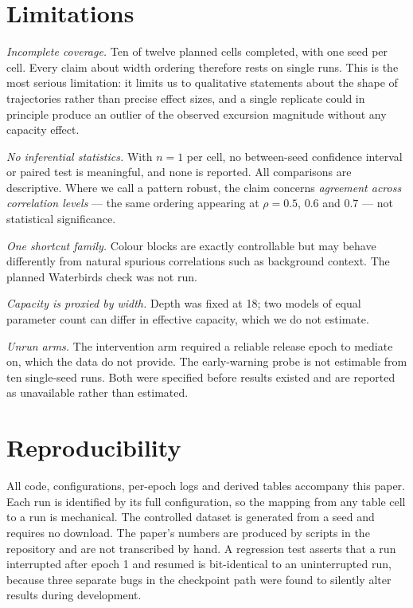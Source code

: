 \documentclass[conference]{IEEEtran}
\begin{document}
\section{Limitations}

\textit{Incomplete coverage.} Ten of twelve planned cells completed, with one seed per
cell. Every claim about width ordering therefore rests on single runs. This is the most
serious limitation: it limits us to qualitative statements about the shape of trajectories
rather than precise effect sizes, and a single replicate could in principle produce an
outlier of the observed excursion magnitude without any capacity effect.

\textit{No inferential statistics.} With $n=1$ per cell, no between-seed confidence
interval or paired test is meaningful, and none is reported. All comparisons are
descriptive. Where we call a pattern robust, the claim concerns \emph{agreement across
correlation levels} --- the same ordering appearing at $\rho=0.5$, $0.6$ and $0.7$ --- not
statistical significance.

\textit{One shortcut family.} Colour blocks are exactly controllable but may behave
differently from natural spurious correlations such as background context. The planned
Waterbirds check was not run.

\textit{Capacity is proxied by width.} Depth was fixed at 18; two models of equal parameter
count can differ in effective capacity, which we do not estimate.

\textit{Unrun arms.} The intervention arm required a reliable release epoch to mediate on,
which the data do not provide. The early-warning probe is not estimable from ten
single-seed runs. Both were specified before results existed and are reported as
unavailable rather than estimated.

\section*{Reproducibility}

All code, configurations, per-epoch logs and derived tables accompany this paper. Each run
is identified by its full configuration, so the mapping from any table cell to a run is
mechanical. The controlled dataset is generated from a seed and requires no download. The
paper's numbers are produced by scripts in the repository and are not transcribed by hand.
A regression test asserts that a run interrupted after epoch 1 and resumed is bit-identical
to an uninterrupted run, because three separate bugs in the checkpoint path were found to
silently alter results during development.
\end{document}
